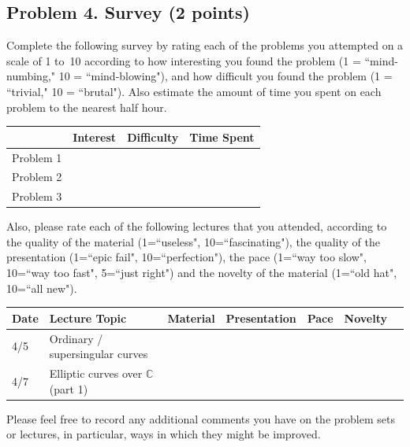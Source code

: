 \documentclass[11pt]{article}
\newcommand{\C}{\mathbb{C}}
\begin{document}
\subsection*{Problem 4. Survey (2 points)}

Complete the following survey by rating each of the problems you attempted on a scale of 1 to~10 according to how interesting you found the problem (1 = ``mind-numbing," 10 = ``mind-blowing"), and how difficult you found the problem (1 = ``trivial," 10 = ``brutal").  Also estimate the amount of time you spent on each problem to the nearest half hour.

\begin{center}
\begin{tabular}{l|r|r|r|}
& Interest & Difficulty & Time Spent\\\hline
Problem 1 & & & \\\hline
Problem 2 & & & \\\hline
Problem 3 & & & \\\hline
\end{tabular}
\end{center}
\noindent
Also, please rate each of the following lectures that you attended, according to the quality of the material (1=``useless", 10=``fascinating"), the quality of the presentation (1=``epic fail", 10=``perfection"), the pace (1=``way too slow", 10=``way too fast", 5=``just right") and the novelty of the material (1=``old hat", 10=``all new").

\begin{center}
\begin{tabular}{l|l|r|r|r|r|r}
Date & Lecture Topic & Material & Presentation & Pace & Novelty\\\hline
4/5 & Ordinary / supersingular curves & & & & \\\hline
4/7 & Elliptic curves over $\C$ (part 1) & & & & \\\hline
\end{tabular}
\end{center}

\noindent
Please feel free to record any additional comments you have on the problem sets or lectures, in particular, ways in which they might be improved.
\end{document}
